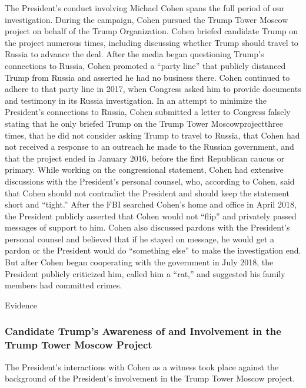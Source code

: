 The President's conduct involving Michael Cohen spans the full period of our investigation. During the campaign, Cohen pursued the Trump Tower Moscow project on behalf of the Trump Organization. Cohen briefed candidate Trump on the project numerous times, including discussing whether Trump should travel to Russia to advance the deal. After the media began questioning Trump's connections to Russia, Cohen promoted a “party line” that publicly distanced Trump from Russia and asserted he had no business there. Cohen continued to adhere to that party line in 2017, when Congress asked him to provide documents and testimony in its Russia investigation. In an attempt to minimize the President's connections to Russia, Cohen submitted a letter to Congress falsely stating that he only briefed Trump on the Trump Tower Moscowprojectthree times, that he did not consider asking Trump to travel to Russia, that Cohen had not received a response to an outreach he made to the Russian government, and that the project ended in January 2016, before the first Republican caucus or primary. While working on the congressional statement, Cohen had extensive discussions with the President's personal counsel, who, according to Cohen, said that Cohen should not contradict the President and should keep the statement short and “tight.” After the FBI searched Cohen's home and office in April 2018, the President publicly asserted that Cohen would not “flip” and privately passed messages of support to him. Cohen also discussed pardons with the President's personal counsel and believed that if he stayed on message, he would get a pardon or the President would do “something else” to make
the investigation end. But after Cohen began cooperating with the government in July 2018, the President publicly criticized him, called him a “rat,” and suggested his family members had committed crimes.

Evidence

\subsubsection{Candidate Trump's Awareness of and Involvement in the Trump Tower Moscow Project}

The President's interactions with Cohen as a witness took place against the background of the President's involvement in the Trump Tower Moscow project.

